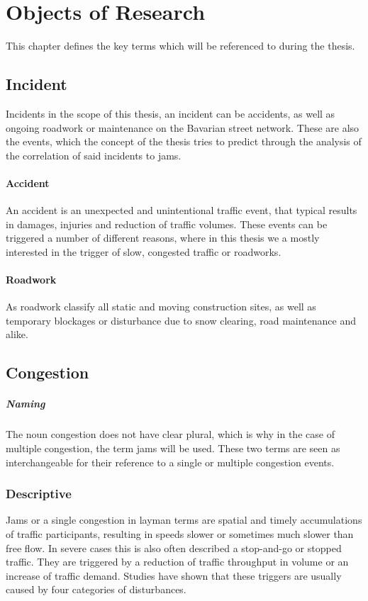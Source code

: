\documentclass[a4paper,headsepline,footsepline,fontsize=11pt,BCOR=12mm,DIV=12]{report}
\begin{document}
\chapter{Objects of Research}
	This chapter defines the key terms which will be referenced to during the thesis.
\section{Incident}
		Incidents in the scope of this thesis, an incident can be accidents, as well as ongoing roadwork or maintenance on the Bavarian street network. These are also the events, which the concept of the thesis tries to predict through the analysis of the correlation of said incidents to jams.
	\subsubsection{Accident}
		An accident is an unexpected and unintentional traffic event, that typical results in damages, injuries and reduction of traffic volumes. These events can be triggered a number of different reasons, where in this thesis we a mostly interested in the trigger of slow, congested traffic or roadworks.
	\subsubsection{Roadwork}
		As roadwork classify all static and moving construction sites, as well as temporary blockages or disturbance due to snow clearing, road maintenance and alike. 
	
\section{Congestion}
\label{definition_congestion}

\paragraph{Naming} The noun congestion does not have clear plural, which is why in the case of multiple congestion, the term jams will be used. These two terms are seen as interchangeable for their reference to a single or multiple congestion events.

\subsection{Descriptive}

Jams or a single congestion in layman terms are spatial and timely accumulations of traffic participants, resulting in speeds slower or sometimes much slower than free flow. In severe cases this is also often described a stop-and-go or stopped traffic. They are triggered by a reduction of traffic throughput in volume or an increase of traffic demand. Studies have shown that these triggers are usually caused by four categories of disturbances. \cite{TRB2003,FHA2011}
\end{document}
